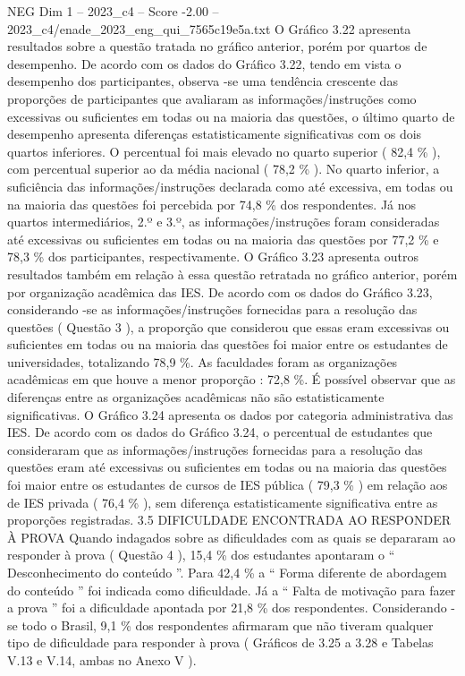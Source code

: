 \begin{textsample}{NEG Dim 1 – 2023\_c4 – Score -2.00 – 2023\_c4/enade\_2023\_eng\_qui\_7565c19e5a.txt}
O Gráfico 3.22 apresenta resultados sobre a questão tratada no gráfico anterior, porém por quartos de desempenho.
De acordo com os dados do Gráfico 3.22, tendo em vista o desempenho dos participantes, observa -se uma tendência crescente das proporções de participantes que avaliaram as informações/instruções como excessivas ou suficientes em todas ou na maioria das questões, o último quarto de desempenho apresenta diferenças estatisticamente significativas com os dois quartos inferiores.
O percentual foi mais elevado no quarto superior ( 82,4 \% ), com percentual superior ao da média nacional ( 78,2 \% ).
No quarto inferior, a suficiência das informações/instruções declarada como até excessiva, em todas ou na maioria das questões foi percebida por 74,8 \% dos respondentes.
Já nos quartos intermediários, 2.º e 3.º, as informações/instruções foram consideradas até excessivas ou suficientes em todas ou na maioria das questões por 77,2 \% e 78,3 \% dos participantes, respectivamente.
O Gráfico 3.23 apresenta outros resultados também em relação à essa questão retratada no gráfico anterior, porém por organização acadêmica das IES.
De acordo com os dados do Gráfico 3.23, considerando -se as informações/instruções fornecidas para a resolução das questões ( Questão 3 ), a proporção que considerou que essas eram excessivas ou suficientes em todas ou na maioria das questões foi maior entre os estudantes de universidades, totalizando 78,9 \%.
As faculdades foram as organizações acadêmicas em que houve a menor proporção : 72,8 \%.
É possível observar que as diferenças entre as organizações acadêmicas não são estatisticamente significativas.
O Gráfico 3.24 apresenta os dados por categoria administrativa das IES.
De acordo com os dados do Gráfico 3.24, o percentual de estudantes que consideraram que as informações/instruções fornecidas para a resolução das questões eram até excessivas ou suficientes em todas ou na maioria das questões foi maior entre os estudantes de cursos de IES pública ( 79,3 \% ) em relação aos de IES privada ( 76,4 \% ), sem diferença estatisticamente significativa entre as proporções registradas. 3.5 DIFICULDADE ENCONTRADA AO RESPONDER À PROVA Quando indagados sobre as dificuldades com as quais se depararam ao responder à prova ( Questão 4 ), 15,4 \% dos estudantes apontaram o “ Desconhecimento do conteúdo ”.
Para 42,4 \% a “ Forma diferente de abordagem do conteúdo ” foi indicada como dificuldade.
Já a “ Falta de motivação para fazer a prova ” foi a dificuldade apontada por 21,8 \% dos respondentes.
Considerando -se todo o Brasil, 9,1 \% dos respondentes afirmaram que não tiveram qualquer tipo de dificuldade para responder à prova ( Gráficos de 3.25 a 3.28 e Tabelas V.13 e V.14, ambas no Anexo V ).

\end{textsample}

